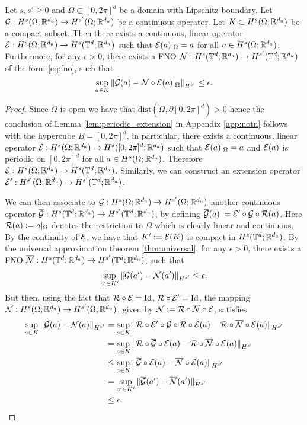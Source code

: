 \documentclass[reqno,a4paper]{amsart}
\begin{document}
\begin{theorem}
\label{thm:universal_extend}
Let \(s, s' \geq 0\) and \(\Omega \subset [0,2\pi]^d\) be a domain with Lipschitz boundary. Let $\mathcal{G}: H^{s}(\Omega;\mathbb{R}^{d_a}) \to H^{s'}(\Omega;\mathbb{R}^{d_u})$ be a continuous operator. Let $K\subset H^{s}(\Omega;\mathbb{R}^{d_a})$ be a compact subset. Then
there exists a continuous, linear operator \(\mathcal{E} : H^s(\Omega;\mathbb{R}^{d_a}) \to H^s(\mathbb{T}^d;\mathbb{R}^{d_a}) \) such that \(\mathcal{E}(a)|_\Omega = a\) for all \(a \in H^s(\Omega;\mathbb{R}^{d_a})\). Furthermore, 
for any $\epsilon > 0$, there exists a FNO $\mathcal{N}: H^{s}(\mathbb{T}^d;\mathbb{R}^{d_a}) \to H^{s'}(\mathbb{T}^d;\mathbb{R}^{d_u})$ of the form \eqref{eq:fno}, such that 
\[
\sup_{a\in K}
\Vert 
\mathcal{G}(a) - \mathcal{N} \circ \mathcal{E} (a)|_\Omega
\Vert_{H^{s'}}
\le \epsilon.
\]
\end{theorem}
\begin{proof}
 Since \(\Omega\) is open we have that \({\text{dist}(\Omega, \partial [0,2\pi]^d) > 0}\) hence the conclusion of Lemma \ref{lem:periodic_extension} in Appendix \ref{app:notn}
follows with the hypercube \(B = [0,2\pi]^d\), in particular,
there exists a continuous, linear operator \(\mathcal{E} : H^s(\Omega;\mathbb{R}^{d_a}) \to H^s([0,2\pi]^d;\mathbb{R}^{d_a})\) such that \(\mathcal{E}(a)|_\Omega = a\) and \(\mathcal{E}(a)\) is periodic on \([0,2\pi]^d\) for all \(a \in H^s(\Omega;\mathbb{R}^{d_a})\). Therefore
\(\mathcal{E} : H^s(\Omega;\mathbb{R}^{d_a}) \to H^s(\mathbb{T}^d;\mathbb{R}^{d_a})\). Similarly, we can construct an extension operator $\mathcal{E}': H^{s'}(\Omega;\mathbb{R}^{d_u}) \to H^{s'}(\mathbb{T}^d;\mathbb{R}^{d_u})$.

We can then associate to $\mathcal{G}: H^s(\Omega; \mathbb{R}^{d_a}) \to H^{s'}(\Omega;\mathbb{R}^{d_u})$ another continuous operator $\overline{\mathcal{G}}: H^s(\mathbb{T}^d; \mathbb{R}^{d_a}) \to H^{s'}(\mathbb{T}^d;\mathbb{R}^{d_u})$, by defining $\overline{\mathcal{G}}(a) := \mathcal{E}' \circ \mathcal{G} \circ \mathcal{R}(a)$. Here $\mathcal{R}(a) := a|_{\Omega}$ denotes the restriction to $\Omega$ which is clearly linear and continuous.
By the continuity of $\mathcal{E}$, we have that $K' := \mathcal{E}(K)$ is compact in $H^s(\mathbb{T}^d;\mathbb{R}^{d_a})$. By the universal approximation theorem \ref{thm:universal}, for any $\epsilon > 0$, there exists a FNO $\overline{\mathcal{N}}: H^s(\mathbb{T}^d; \mathbb{R}^{d_a}) \to H^{s'}(\mathbb{T}^d;\mathbb{R}^{d_u})$, such that 
\[
\sup_{a'\in K'} \Vert \overline{\mathcal{G}}(a') - \overline{\mathcal{N}}(a') \Vert_{H^{s'}} \le \epsilon.
\]
But then, using the fact that $\mathcal{R} \circ \mathcal{E} = \mathrm{Id}$, $\mathcal{R}\circ \mathcal{E}' = \mathrm{Id}$, the mapping $\mathcal{N}: H^s(\Omega;\mathbb{R}^{d_a}) \to H^{s'}(\Omega;\mathbb{R}^{d_u})$, 
given by $\mathcal{N} := \mathcal{R} \circ \overline{\mathcal{N}} \circ \mathcal{E}$, satisfies
\begin{align*}
\sup_{a\in K} \Vert {\mathcal{G}}(a) - {\mathcal{N}}(a) \Vert_{H^{s'}} 
&=
\sup_{a\in K} \Vert \mathcal{R} \circ \mathcal{E}' \circ {\mathcal{G}} \circ \mathcal{R} \circ \mathcal{E}(a) - \mathcal{R} \circ \overline{\mathcal{N}} \circ \mathcal{E}(a) \Vert_{H^{s'}} 
\\
&=
\sup_{a\in K} \Vert \mathcal{R} \circ \overline{\mathcal{G}} \circ \mathcal{E}(a) - \mathcal{R} \circ \overline{\mathcal{N}} \circ \mathcal{E}(a) \Vert_{H^{s'}} 
\\
&\le
\sup_{a\in K} \Vert \overline{\mathcal{G}} \circ \mathcal{E}(a) - \overline{\mathcal{N}} \circ \mathcal{E}(a) \Vert_{H^{s'}}
\\
&=
\sup_{a'\in K'} \Vert \overline{\mathcal{G}}(a') - \overline{\mathcal{N}}(a') \Vert_{H^{s'}}
\\
&\le \epsilon.
\end{align*}
\end{proof}
\end{document}
